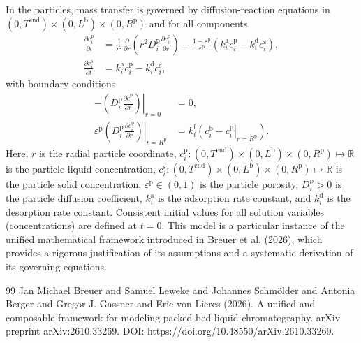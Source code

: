 \documentclass{article}
\begin{document}
In the particles, mass transfer is governed by diffusion-reaction equations in $(0, T^{\mathrm{end}}) \times (0, L^{\mathrm{b}})\times (0, R^{\mathrm{p}})$ and for all components
\begin{align}
    \frac{\partial c^{\mathrm{p}}_{i}}{\partial t}
    &= \frac{1}{r^{2}} \frac{\partial }{\partial r} \left( r^{2} D^{\mathrm{p}}_{i} \frac{\partial c^{\mathrm{p}}_{i}}{\partial r} \right)
        - \frac{1 - \varepsilon^{\mathrm{p}}}{\varepsilon^{\mathrm{p}}}\left(k^{\mathrm{a}}_{i} c^{\mathrm{p}}_{i} - k^{\mathrm{d}}_{i} c^{\mathrm{s}}_{i} \right),
    \\
    \frac{\partial c^{\mathrm{s}}_{i}}{\partial t}
    &= k^{\mathrm{a}}_{i} c^{\mathrm{p}}_{i}
        - k^{\mathrm{d}}_{i} c^{\mathrm{s}}_{i},
\end{align}
with boundary conditions
\begin{align}
    - \left. \left( D^{\mathrm{p}}_{i} \frac{\partial c^{\mathrm{p}}_{i}}{\partial r} \right) \right|_{r=0}
    &= 0,
    \\
    \varepsilon^{\mathrm{p}} \left. \left( D^{\mathrm{p}}_{i} \frac{\partial c^{\mathrm{p}}_{i}}{\partial r} \right)\right|_{r = R^{\mathrm{p}}}
    &= k^{\mathrm{f}}_{i} \left. \left( c^{\mathrm{b}}_{i} - c^{\mathrm{p}}_{i} \right|_{r = R^{\mathrm{p}}} \right).
\end{align}
Here, $r$ is the radial particle coordinate, $c^{\mathrm{p}}_{i}\colon (0, T^{\mathrm{end}}) \times (0, L^{\mathrm{b}})\times (0, R^{\mathrm{p}}) \mapsto \mathbb{R}$ is the particle liquid concentration, $c^{\mathrm{s}}_{i}\colon (0, T^{\mathrm{end}}) \times (0, L^{\mathrm{b}})\times (0, R^{\mathrm{p}}) \mapsto \mathbb{R}$ is the particle solid concentration, $\varepsilon^{\mathrm{p}}\in (0, 1)$ is the particle porosity, $D^{\mathrm{p}}_{i}> 0$ is the particle diffusion coefficient, $k^{\mathrm{a}}_{i}$ is the adsorption rate constant, and $k^{\mathrm{d}}_{i}$ is the desorption rate constant.
Consistent initial values for all solution variables (concentrations) are defined at $t = 0$.
This model is a particular instance of the unified mathematical framework introduced in Breuer et al. (2026), which provides a rigorous justification of its assumptions and a systematic derivation of its governing equations.
\begin{thebibliography}{99}
     Jan Michael Breuer and Samuel Leweke and Johannes Schmölder and Antonia Berger and Gregor J. Gassner and Eric von Lieres (2026). A unified and composable framework for modeling packed-bed liquid chromatography. arXiv preprint arXiv:2610.33269. DOI: https://doi.org/10.48550/arXiv.2610.33269.
\end{thebibliography}
\end{document}
